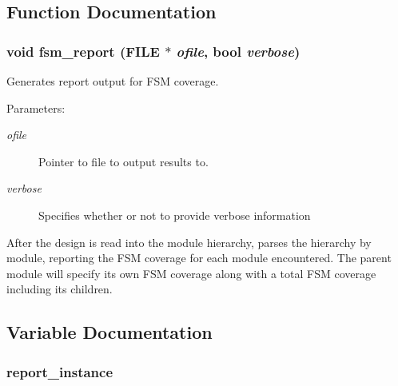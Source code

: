 \subsection{Function Documentation}
\subsubsection{\setlength{\rightskip}{0pt plus 5cm}void fsm\_\-report (FILE $\ast$ {\em ofile}, {\bf bool} {\em verbose})}\label{fsm_8c_a1}


Generates report output for FSM coverage.

\begin{Desc}
\item[Parameters: ]\par
\begin{description}
\item[{\em 
ofile}]Pointer to file to output results to. \item[{\em 
verbose}]Specifies whether or not to provide verbose information\end{description}
\end{Desc}
After the design is read into the module hierarchy, parses the hierarchy by module, reporting the FSM coverage for each module encountered. The parent module will specify its own FSM coverage along with a total FSM coverage including its  children. 

\subsection{Variable Documentation}
\subsubsection{ report\_\-instance}\label{fsm_8c_a0}


